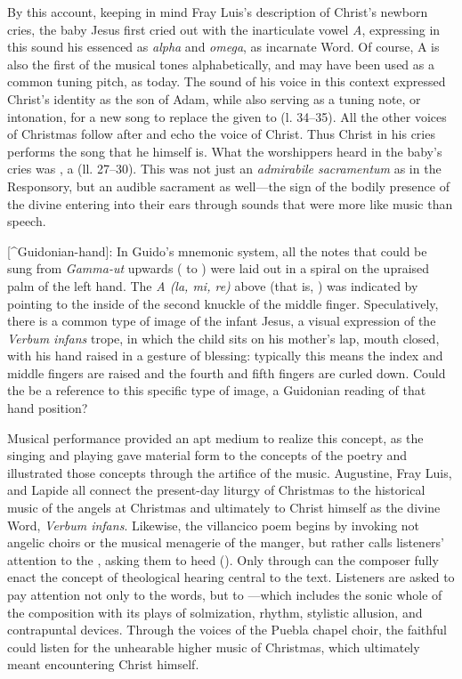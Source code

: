 \noindent
By this account, keeping in mind Fray Luis's description of Christ's newborn
cries, the baby Jesus first cried out with the inarticulate vowel \emph{A},
expressing in this sound his essenced as \emph{alpha} and \emph{omega}, as incarnate Word.
Of course, A is also the first of the musical tones alphabetically, and may have
been used as a common tuning pitch, as today.
The sound of his voice in this context expressed Christ's identity as the son of
Adam, while also serving as a tuning note, or intonation, for a new song to
replace the  given to  (l. 34--35).
All the other voices of Christmas follow after and echo the voice of Christ.
Thus Christ in his cries performs the song that he himself is.
What the worshippers heard in the baby's cries was , a  (ll.
27--30).
This was not just an \emph{admirabile sacramentum} as in the Responsory, but an
audible sacrament as well---the sign of the bodily presence of the divine
entering into their ears through sounds that were more like music than speech.

[^Guidonian-hand]:
In Guido's mnemonic system, all the notes that could be sung from \emph{Gamma-ut}
upwards ( to ) were laid out in a spiral on the upraised palm of the
left hand.
The \emph{A (la, mi, re)} above  (that is, ) was indicated by pointing
to the inside of the second knuckle of the middle finger.
Speculatively, there is a common type of image of the infant Jesus, a visual
expression of the \emph{Verbum infans} trope, in which the child sits on his mother's
lap, mouth closed, with his hand raised in a gesture of blessing: typically this
means the index and middle fingers are raised and the fourth and fifth fingers
are curled down.
Could the  be a reference to this specific type of image, a Guidonian
reading of that hand position?


Musical performance provided an apt medium to realize this concept, as the
singing and playing gave material form to the concepts of the poetry and
illustrated those concepts through the artifice of the music.
Augustine, Fray Luis, and Lapide all connect the present-day liturgy of
Christmas to the historical music of the angels at Christmas and ultimately to
Christ himself as the divine Word, \emph{Verbum infans}.
Likewise, the villancico poem begins by invoking not angelic choirs or the
musical menagerie of the manger, but rather calls listeners' attention to the
, asking them to heed  ().
Only through  can the composer fully enact the
concept of theological hearing central to the text.
Listeners are asked to pay attention not only to the words, but to ---which includes the sonic whole of the composition with its plays of
solmization, rhythm, stylistic allusion, and contrapuntal devices.
Through the voices of the Puebla chapel choir, the faithful could listen for the
unhearable higher music of Christmas, which ultimately meant encountering Christ
himself.


